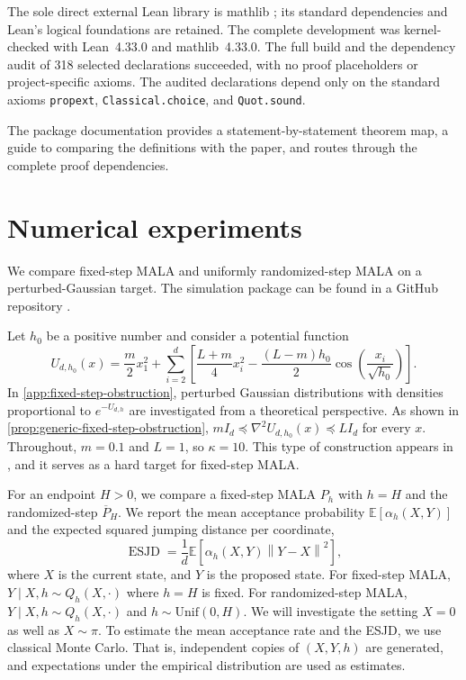 \documentclass[11pt]{article}
\newcommand{\E}{\mathbb E}
\newcommand{\norm}[1]{\left\lVert #1\right\rVert}
\newcommand{\1}{\mathbf 1}
\begin{document}
	The sole direct external Lean library is mathlib \citep{Mathlib2020};
	its standard dependencies and Lean's logical foundations are retained.
	The complete development was kernel-checked with Lean~4.33.0 and
	mathlib~4.33.0. The full build and the dependency audit of 318 selected
	declarations succeeded, with no proof placeholders or project-specific
	axioms. The audited declarations depend only on the standard axioms
	\texttt{propext}, \texttt{Classical.choice}, and \texttt{Quot.sound}.
	
	The package documentation provides a statement-by-statement theorem
	map, a guide to comparing the definitions with the paper, and routes
	through the complete proof dependencies. 
	
	\section{Numerical experiments}\label{sec:simulations}
	
	We compare fixed-step MALA and uniformly randomized-step MALA on a
	perturbed-Gaussian target.
	The simulation package can be found in a GitHub repository \citep{qinMALALean2026}.
	
	Let $h_0$ be a positive number and consider a potential function
	\begin{equation}\label{eq:simulation-hard-target}
		U_{d,h_0}(x)
		=\frac{m}{2}x_1^2
		+\sum_{i=2}^d\left[
		\frac{L+m}{4}x_i^2
		-\frac{(L-m)h_0}{2}
		\cos\left(\frac{x_i}{\sqrt{h_0}}\right)
		\right].
	\end{equation}
	In \cref{app:fixed-step-obstruction}, perturbed Gaussian distributions with densities proportional to $e^{-U_{d,h}}$ are investigated from a theoretical perspective.
	As shown in \cref{prop:generic-fixed-step-obstruction},
	\(mI_d\preceq\nabla^2U_{d,h_0}(x)\preceq LI_d\) for every \(x\).
	Throughout, \(m=0.1\) and \(L=1\), so \(\kappa=10\).
	This type of construction appears in \citep{ChewiEtAl2021,LeeShenTian2021,WuSchmidlerChen2022}, and it serves as a hard target for fixed-step MALA.
	
	For an endpoint \(H>0\), we compare a fixed-step MALA $P_h$ with \(h=H\) and the randomized-step $\overline P_H$.  We report the mean
	acceptance probability $\E\left[
	\alpha_h(X,Y)
	\right]$
	and the expected squared jumping distance per
	coordinate,
	\begin{equation}\nonumber
		\operatorname{ESJD}
		=\frac1d\E\left[
		\alpha_h(X,Y)\norm{Y-X}^2
		\right],
	\end{equation}
	where $X$ is the current state, and $Y$ is the proposed state.
	For fixed-step MALA, $Y \mid X,h \sim Q_h(X, \cdot)$ where $h = H$ is fixed.
	For randomized-step MALA, $Y \mid X, h \sim Q_h(X, \cdot)$ and $h \sim \mathrm{Unif}(0,H)$.
	We will investigate the setting $X = 0$ as well as $X \sim \pi$.
	To estimate the mean acceptance rate and the ESJD, we use classical Monte Carlo.
	That is, independent copies of $(X,Y,h)$ are generated, and expectations under the empirical distribution are used as estimates.
	
\end{document}
